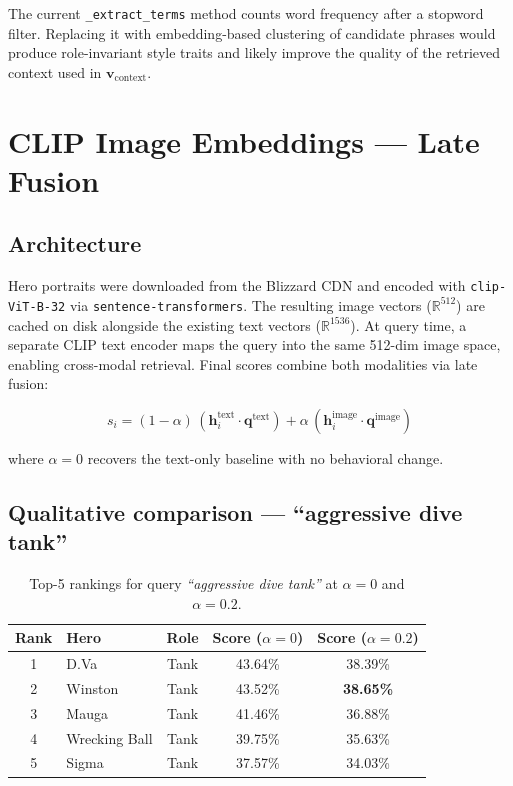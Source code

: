 \documentclass[11pt, a4paper]{article}
\begin{document}
The current \texttt{\_extract\_terms} method counts word frequency after a
stopword filter.  Replacing it with embedding-based clustering of candidate
phrases would produce role-invariant style traits and likely improve the quality
of the retrieved context used in $\mathbf{v}_\text{context}$.

\section{CLIP Image Embeddings — Late Fusion}

\subsection{Architecture}

Hero portraits were downloaded from the Blizzard CDN and encoded with
\texttt{clip-ViT-B-32} via \texttt{sentence-transformers}.  The resulting
image vectors ($\mathbb{R}^{512}$) are cached on disk alongside the existing
text vectors ($\mathbb{R}^{1536}$).  At query time, a separate CLIP text
encoder maps the query into the same 512-dim image space, enabling
cross-modal retrieval.  Final scores combine both modalities via late fusion:

\begin{equation}
s_i = (1 - \alpha)\,(\mathbf{h}^\text{text}_i \cdot \mathbf{q}^\text{text})
    + \alpha\,(\mathbf{h}^\text{image}_i \cdot \mathbf{q}^\text{image})
\label{eq:latefusion}
\end{equation}

where $\alpha = 0$ recovers the text-only baseline with no behavioral change.

\subsection{Qualitative comparison — ``aggressive dive tank''}

\begin{table}[h]
\centering
\caption{Top-5 rankings for query \textit{``aggressive dive tank''} at $\alpha=0$ and $\alpha=0.2$.}
\begin{tabular}{clccc}
\toprule
Rank & Hero & Role & Score ($\alpha=0$) & Score ($\alpha=0.2$) \\
\midrule
1 & D.Va    & Tank & 43.64\% & 38.39\% \\
2 & Winston & Tank & 43.52\% & \textbf{38.65\%} \\
3 & Mauga   & Tank & 41.46\% & 36.88\% \\
4 & Wrecking Ball & Tank & 39.75\% & 35.63\% \\
5 & Sigma   & Tank & 37.57\% & 34.03\% \\
\bottomrule
\end{tabular}
\end{table}
\end{document}
